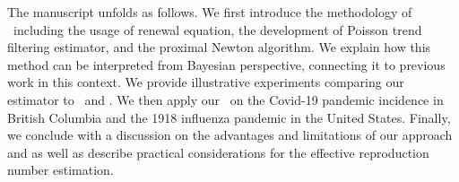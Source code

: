 The manuscript unfolds as follows. We first introduce the methodology of
\RtEstim\ including the usage of renewal equation, the development of Poisson
trend filtering estimator, and the proximal Newton algorithm. We explain how 
this method can be interpreted from Bayesian perspective, connecting it to
previous work in this context. We provide illustrative
experiments comparing our estimator to \EpiEstim\ and \EpiLPS. We
then apply our \RtEstim\ on the Covid-19 pandemic incidence in British Columbia
and the 1918 influenza pandemic in the United States. Finally, we conclude with
a discussion on the advantages and limitations of our approach and as well as
describe practical considerations for
the effective reproduction number estimation.
